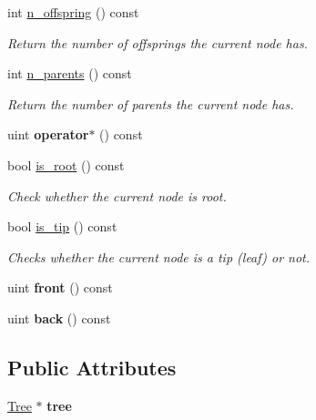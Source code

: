 \begin{DoxyCompactItemize}
int \hyperlink{classTreeIterator_a0c472982f19ce786b1804604630e8b70}{n\+\_\+offspring} () const
\begin{DoxyCompactList}\small\item\em Return the number of offsprings the current node has. \end{DoxyCompactList}\item 
\mbox{\label{classTreeIterator_a719b54a7943b2c0f558f28f08b5034b1}} 
int \hyperlink{classTreeIterator_a719b54a7943b2c0f558f28f08b5034b1}{n\+\_\+parents} () const
\begin{DoxyCompactList}\small\item\em Return the number of parents the current node has. \end{DoxyCompactList}\item 
\mbox{\label{classTreeIterator_a8a8e3d1ee89724fbd949235502737bc9}} 
uint {\bfseries operator$\ast$} () const
\item 
\mbox{\label{classTreeIterator_a4cfe6295bd7c8d1ca57c76882cdad7d8}} 
bool \hyperlink{classTreeIterator_a4cfe6295bd7c8d1ca57c76882cdad7d8}{is\+\_\+root} () const
\begin{DoxyCompactList}\small\item\em Check whether the current node is root. \end{DoxyCompactList}\item 
\mbox{\label{classTreeIterator_a5ea48c035ffa01b98842d043d22f6e76}} 
bool \hyperlink{classTreeIterator_a5ea48c035ffa01b98842d043d22f6e76}{is\+\_\+tip} () const
\begin{DoxyCompactList}\small\item\em Checks whether the current node is a tip (leaf) or not. \end{DoxyCompactList}\item 
\mbox{\label{classTreeIterator_a37f0905857179d16537e79f5fb163f09}} 
uint {\bfseries front} () const
\item 
\mbox{\label{classTreeIterator_a9f4f8c8adf0f9bd6548f4874869682a1}} 
uint {\bfseries back} () const
\end{DoxyCompactItemize}
\subsection*{Public Attributes}
\begin{DoxyCompactItemize}
\item 
\mbox{\label{classTreeIterator_adb38d3ef0bf6f6cb75ea183b146946ed}} 
\hyperlink{classTree}{Tree} $\ast$ {\bfseries tree}
\end{DoxyCompactItemize}

